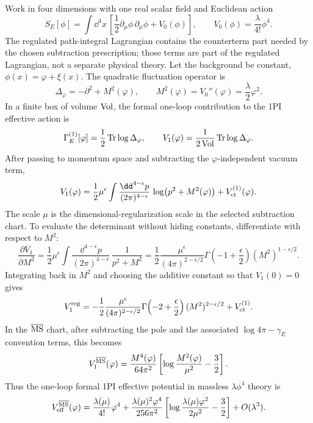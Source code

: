 Work in four dimensions with one real scalar field and Euclidean action
\[
  S_E[\phi]
  =
  \int \dd^4x\,
  \left[
    \frac12\partial_\mu\phi\,\partial_\mu\phi
    +
    V_0(\phi)
  \right],
  \qquad
  V_0(\phi)=\frac{\lambda}{4!}\phi^4 .
\]
The regulated path-integral Lagrangian contains the counterterm part needed by
the chosen subtraction prescription; those terms are part of the regulated
Lagrangian, not a separate physical theory.  Let the background be constant,
\(\phi(x)=\varphi+\xi(x)\).  The quadratic fluctuation operator is
\[
  \Delta_\varphi
  =
  -\partial^2+M^2(\varphi),
  \qquad
  M^2(\varphi)=V_0''(\varphi)=\frac{\lambda}{2}\varphi^2 .
\]
In a finite box of volume \({\rm Vol}\), the formal one-loop contribution to
the 1PI effective action is
\[
  \Gamma_E^{(1)}[\varphi]
  =
  \frac12\operatorname{Tr}\log\Delta_\varphi ,
  \qquad
  V_1(\varphi)
  =
  \frac{1}{2\,{\rm Vol}}\operatorname{Tr}\log\Delta_\varphi .
\]
After passing to momentum space and subtracting the \(\varphi\)-independent
vacuum term,
\begin{equation}
  V_1(\varphi)
  =
  \frac12\mu^\epsilon
  \int\frac{\dd^{4-\epsilon}p}{(2\pi)^{4-\epsilon}}\,
  \log\bigl(p^2+M^2(\varphi)\bigr)
  +V_{\rm ct}^{(1)}(\varphi).
  \label{eq:cw-one-loop-log-determinant}
\end{equation}
The scale \(\mu\) is the dimensional-regularization scale in the selected
subtraction chart.  To evaluate the determinant without hiding constants,
differentiate with respect to \(M^2\):
\[
  \frac{\partial V_1}{\partial M^2}
  =
  \frac12\mu^\epsilon
  \int\frac{\dd^{4-\epsilon}p}{(2\pi)^{4-\epsilon}}\,
  \frac1{p^2+M^2}
  =
  \frac12
  \frac{\mu^\epsilon}{(4\pi)^{2-\epsilon/2}}
  \Gamma\!\left(-1+\frac{\epsilon}{2}\right)
  (M^2)^{1-\epsilon/2}.
\]
Integrating back in \(M^2\) and choosing the additive constant so that
\(V_1(0)=0\) gives
\[
  V_1^{\rm reg}
  =
  -\frac12
  \frac{\mu^\epsilon}{(4\pi)^{2-\epsilon/2}}
  \Gamma\!\left(-2+\frac{\epsilon}{2}\right)
  (M^2)^{2-\epsilon/2}
  +V_{\rm ct}^{(1)} .
\]
In the \(\overline{\rm MS}\) chart, after subtracting the pole and the
associated \(\log 4\pi-\gamma_E\) convention terms, this becomes
\begin{equation}
  V_1^{\overline{\rm MS}}(\varphi)
  =
  \frac{M^4(\varphi)}{64\pi^2}
  \left[
    \log\frac{M^2(\varphi)}{\mu^2}
    -\frac32
  \right].
  \label{eq:cw-one-loop-msbar-general}
\end{equation}
Thus the one-loop formal 1PI effective potential in massless \(\lambda\phi^4\)
theory is
\begin{equation}
  V_{\rm eff}^{\overline{\rm MS}}(\varphi)
  =
  \frac{\lambda(\mu)}{4!}\varphi^4
  +
  \frac{\lambda(\mu)^2\varphi^4}{256\pi^2}
  \left[
    \log\frac{\lambda(\mu)\varphi^2}{2\mu^2}
    -\frac32
  \right]
  +O(\lambda^3).
  \label{eq:cw-msbar-massless-phi4}
\end{equation}
